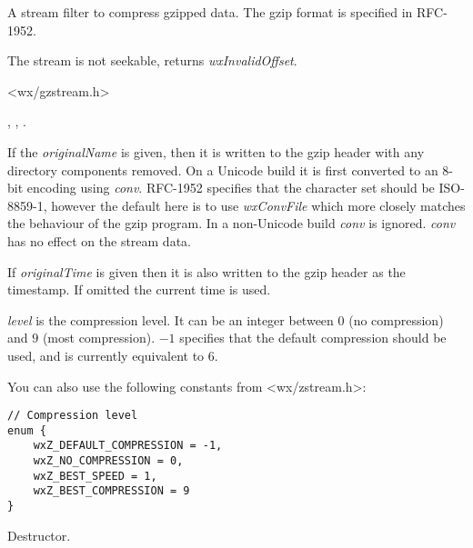A stream filter to compress gzipped data. The gzip format is specified in
RFC-1952.

The stream is not seekable,  returns 
 {\it wxInvalidOffset}.





<wx/gzstream.h>


, 
 ,
 .



\label{wxgzipoutputstreamwxgzipoutputstream}


If the {\it originalName} is given, then it is written to the gzip header
with any directory components removed. On a Unicode build it is first
converted to an 8-bit encoding using {\it conv}. RFC-1952 specifies that
the character set should be ISO-8859-1, however the default here is to
use {\it wxConvFile} which more closely matches the behaviour of the gzip
program. In a non-Unicode build {\it conv} is ignored. {\it conv} has no
effect on the stream data.

If {\it originalTime} is given then it is also written to the gzip header
as the timestamp. If omitted the current time is used.

{\it level} is the compression level. It can be an integer between $0$ (no
compression) and $9$ (most compression). $-1$ specifies that the default
compression should be used, and is currently equivalent to $6$.

You can also use the following constants from <wx/zstream.h>:

\begin{verbatim}
// Compression level
enum {
    wxZ_DEFAULT_COMPRESSION = -1,
    wxZ_NO_COMPRESSION = 0,
    wxZ_BEST_SPEED = 1,
    wxZ_BEST_COMPRESSION = 9
}
\end{verbatim}


\label{wxgzipoutputstreamdtor}


Destructor.

